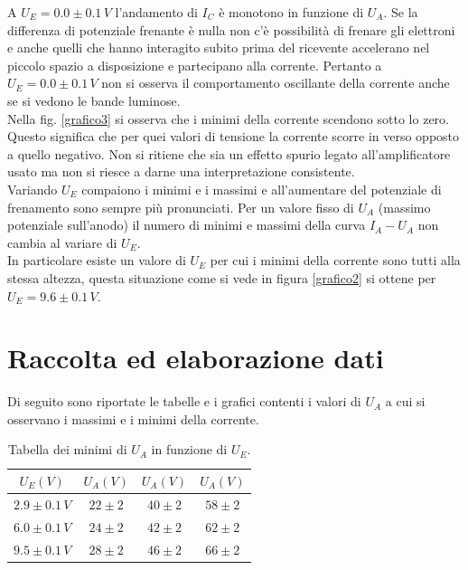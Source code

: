 \documentclass[10pt,a4paper]{article}
\begin{document}
A $U_E = 0.0 \pm0.1\, V$ l'andamento di $I_C$ è monotono in funzione di $U_A$.
Se la differenza di potenziale frenante è nulla non c'è possibilità di frenare gli elettroni e anche quelli che hanno interagito subito prima del ricevente accelerano nel piccolo spazio a disposizione e partecipano alla corrente. Pertanto a $U_E = 0.0\pm0.1\,V$ non si osserva il comportamento oscillante della corrente anche se si vedono le bande luminose.\\ 
Nella fig. \ref{grafico3} si osserva che i minimi della corrente scendono sotto lo zero. Questo significa che per quei valori di tensione la corrente scorre in verso opposto a quello negativo. Non si ritiene che sia un effetto spurio legato all'amplificatore usato ma non si riesce a darne una interpretazione consistente.\\
Variando $U_E$ compaiono i minimi e i massimi e all'aumentare del potenziale di frenamento sono sempre più pronunciati. Per un valore fisso di $U_A$ (massimo potenziale sull'anodo) il numero di minimi e massimi della curva $I_A-U_A$ non cambia al variare di $U_E$.\\

In particolare esiste un valore di $U_E$ per cui i minimi della corrente sono tutti alla stessa altezza, questa situazione come si vede in figura \ref{grafico2} si ottene per $U_E = 9.6 \pm0.1 \, V$.\\

\section{Raccolta ed elaborazione dati}

Di seguito sono riportate le tabelle e i grafici contenti i valori di $U_A$ a cui si osservano i massimi e i minimi della corrente.\\

\begin{table}[!htb]
\centering
\begin{tabular}{|c|c|c|c|}
\hline 
$U_E (V)$ & $U_A (V)$ & $U_A (V)$ & $U_A (V)$ \\ 
\hline 
$2.9\pm0.1\,V$ & $22\pm2$ & $40\pm2$ & $58\pm2$ \\ 
\hline 
$6.0\pm0.1\,V$ & $24\pm2$ & $42\pm2$ & $62\pm2$ \\ 
\hline 
$9.5\pm0.1\,V$ & $28\pm2$ & $46\pm2$ & $66 \pm 2$ \\ 
\hline 
\end{tabular}
\caption{Tabella dei minimi di $U_A$ in funzione di $U_E$.}
\label{tabellaMinimi} 
\end{table}
\end{document}
